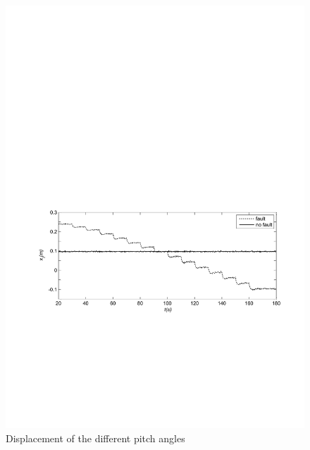 \begin{figure}[!htb]
  \centering
  \includegraphics[width=\hsize]{MATLAB-fault25.pdf}
  \caption{Displacement of the different pitch angles}
  \label{fig:fault25}
\end{figure}

